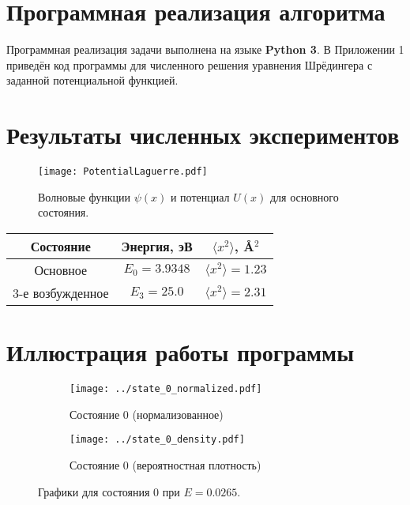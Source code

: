 \documentclass[a4paper, 12pt]{article}
\begin{document}
\section{Программная реализация алгоритма}
Программная реализация задачи выполнена на языке \textbf{Python 3}. В Приложении 1 приведён код программы для численного решения уравнения Шрёдингера с заданной потенциальной функцией.

\section{Результаты численных экспериментов}
\begin{figure}[h!]
    \centering
    \texttt{[image: PotentialLaguerre.pdf]}
    \caption{Волновые функции $\psi(x)$ и потенциал $U(x)$ для основного состояния.}
\end{figure}

\begin{tabular}{|c|c|c|}
\hline
\textbf{Состояние} & \textbf{Энергия, эВ} & $\langle x^2 \rangle$, \AA$^2$ \\
\hline
Основное & $E_0 = 3.9348$ & $\langle x^2 \rangle = 1.23$ \\
3-е возбужденное & $E_3 = 25.0$ & $\langle x^2 \rangle = 2.31$ \\
\hline
\end{tabular}


\section*{Иллюстрация работы программы}

\begin{figure}[H]
    \centering
    \begin{subfigure}[b]{0.45\textwidth}
        \texttt{[image: ../state\_0\_normalized.pdf]}
        \caption{Состояние 0 (нормализованное)}
        \label{fig:state_0_normalized}
    \end{subfigure}
    \hfill
    \begin{subfigure}[b]{0.45\textwidth}
        \texttt{[image: ../state\_0\_density.pdf]}
        \caption{Состояние 0 (вероятностная плотность)}
        \label{fig:state_0_density}
    \end{subfigure}
    \caption{Графики для состояния 0 при \( E = 0.0265 \).}
    \label{fig:state_0}
\end{figure}
\end{document}
